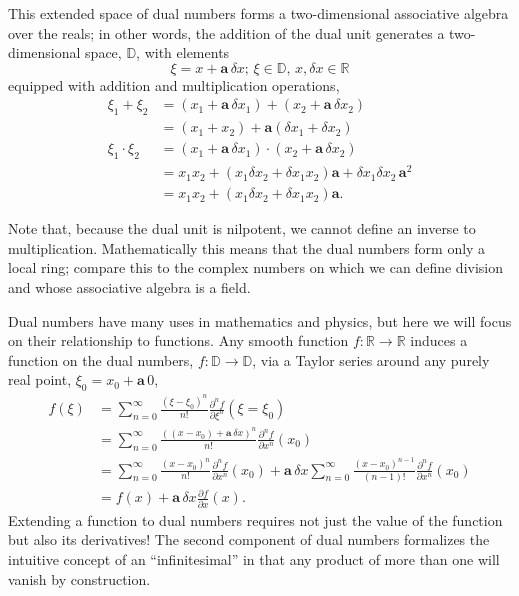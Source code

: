 This extended space of dual numbers forms a two-dimensional associative algebra 
over the reals; in other words, the addition of the dual unit generates a two-dimensional
space, $\mathbb{D}$, with elements
%
\begin{equation*}
\xi = x + \mathbf{a} \, \delta x; \, \xi \in \mathbb{D}, \, x, \delta x \in \mathbb{R}
\end{equation*}
%
equipped with addition and multiplication operations,
%
\begin{align*}
\xi_{1} + \xi_{2} &= \left( x_{1} + \mathbf{a} \, \delta x_{1} \right) + \left( x_{2} + \mathbf{a} \,  \delta x_{2} \right) 
\\
&= \left( x_{1} + x_{2} \right) + \mathbf{a} \left( \delta x_{1} + \delta x_{2} \right) 
\\
\xi_{1} \cdot \xi_{2} 
&= \left( x_{1} + \mathbf{a} \, \delta x_{1} \right) \cdot \left( x_{2} + \mathbf{a} \, \delta x_{2} \right) 
\\
&= x_{1} x_{2} + \left( x_{1} \delta x_{2} + \delta x_{1} x_{2} \right) \mathbf{a} + \delta x_{1} \delta x_{2} \, \mathbf{a}^{2} 
\\
&= x_{1} x_{2} + \left( x_{1} \delta x_{2} + \delta x_{1} x_{2} \right) \mathbf{a}.
\end{align*}  

Note that, because the dual unit is nilpotent, we cannot define an inverse to multiplication.  
Mathematically this means that the dual numbers form only a local ring; compare this to 
the complex numbers on which we can define division and whose associative algebra is a field.

Dual numbers have many uses in mathematics and physics, but here we will focus on their
relationship to functions.  Any smooth function $f : \mathbb{R} \rightarrow \mathbb{R}$ 
induces a function on the dual numbers, $f : \mathbb{D} \rightarrow \mathbb{D}$, 
via a Taylor series around any purely real point, $\xi_{0} = x_{0} + \mathbf{a} \, 0$,
%
\begin{align*}
f \! \left( \xi \right) 
&= 
\sum_{n = 0}^{\infty} \frac{ \left( \xi - \xi_{0} \right)^{n} }{n!} 
\frac{ \partial^{n} f }{ \partial \xi^{n} } \! \left( \xi = \xi_{0} \right) 
\\
&= 
\sum_{n = 0}^{\infty} \frac{ \left( \left( x - x_{0} \right) + \mathbf{a} \, \delta x \right)^{n} }{n!} 
\frac{ \partial^{n} f }{ \partial x^{n} } \! \left( x_{0} \right)
\\
&= 
\sum_{n = 0}^{\infty} \frac{ \left( x - x_{0} \right)^{n} }{n!} 
\frac{ \partial^{n} f }{ \partial x^{n} } \! \left( x_{0} \right)
+ \mathbf{a} \, \delta x \sum_{n = 0}^{\infty} \frac{ \left( x - x_{0} \right)^{n - 1} }{\left( n - 1 \right)!} 
\frac{ \partial^{n} f }{ \partial x^{n} } \! \left( x_{0} \right) 
\\
&= 
f \! \left( x \right) 
+ \mathbf{a} \, \delta x \frac{ \partial f }{ \partial x } \! \left( x \right).
\end{align*}
%
Extending a function to dual numbers requires not just the value of the function
but also its derivatives!  The second component of dual numbers formalizes
the intuitive concept of an ``infinitesimal'' in that any product of more than one
will vanish by construction.

